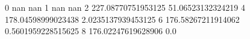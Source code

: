 0 nan nan
1 nan nan
2 227.08770751953125 51.06523132324219
4 178.04598999023438 2.0235137939453125
6 176.58267211914062 0.5601959228515625
8 176.02247619628906 0.0
